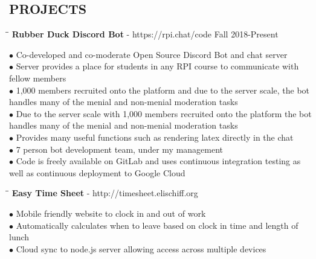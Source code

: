 \documentclass{res}
\begin{document}
\begin{resume}
\vspace{-0.1in}
\section{PROJECTS}
	\vspace{-0.1in}
	\begin{tabbing}
   \hspace{2.3in}\= \hspace{3.6in}\= \kill
    {\bf Rubber Duck Discord Bot} - https://rpi.chat/code \>   \>Fall 2018-Present
   \end{tabbing}\vspace{-20pt}
   $\bullet$ Co-developed and co-moderate Open Source Discord Bot and chat server\\
   $\bullet$ Server provides a place for students in any RPI course to communicate with fellow members \\
   $\bullet$ 1,000 members recruited onto the platform and due to the server scale, the bot handles many of the menial and non-menial moderation tasks\\
   $\bullet$ Due to the server scale with 1,000 members recruited onto the platform the bot handles many of the menial and non-menial moderation tasks\\
   $\bullet$ Provides many useful functions such as rendering latex directly in the chat\\
   $\bullet$ 7 person bot development team, under my management\\
   $\bullet$ Code is freely available on GitLab and uses continuous integration testing as well as continuous deployment to Google Cloud
	\vspace{-15pt}
	\begin{tabbing}
   \hspace{2.3in}\= \hspace{4.4in}\= \kill
    {\bf Easy Time Sheet} - http://timesheet.elischiff.org\>  
   \end{tabbing}\vspace{-20pt}
	$\bullet$ Mobile friendly website to clock in and out of work\\
	$\bullet$ Automatically calculates when to leave based on clock in time and length of lunch\\
	$\bullet$ Cloud sync to node.js server allowing access across multiple devices


\end{resume}
\end{document}
